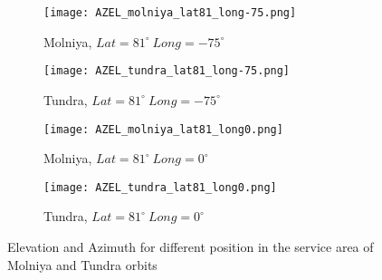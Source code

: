 \begin{figure}[h]\ContinuedFloat
	\begin{subfigure}{.5\textwidth}
	\centering
	\texttt{[image: AZEL\_molniya\_lat81\_long-75.png]}
	\caption{Molniya, $Lat = 81^\circ ~ Long = -75^\circ$}
	\end{subfigure}
	\begin{subfigure}{.5\textwidth}
	\centering
	\texttt{[image: AZEL\_tundra\_lat81\_long-75.png]}
	\caption{Tundra, $Lat = 81^\circ ~ Long = -75^\circ$}
	\end{subfigure}
	\vspace{0.5cm}
	\begin{subfigure}{.5\textwidth}
	\centering
	\texttt{[image: AZEL\_molniya\_lat81\_long0.png]}
	\caption{Molniya, $Lat = 81^\circ ~ Long = 0^\circ$}
	\end{subfigure}
	\begin{subfigure}{.5\textwidth}
	\centering
	\texttt{[image: AZEL\_tundra\_lat81\_long0.png]}
	\caption{Tundra, $Lat = 81^\circ ~ Long = 0^\circ$}
	\end{subfigure}
	\caption{Elevation and Azimuth for different position in the service area of Molniya and Tundra orbits}
	\label{fig:elevation_multi}
\end{figure}
